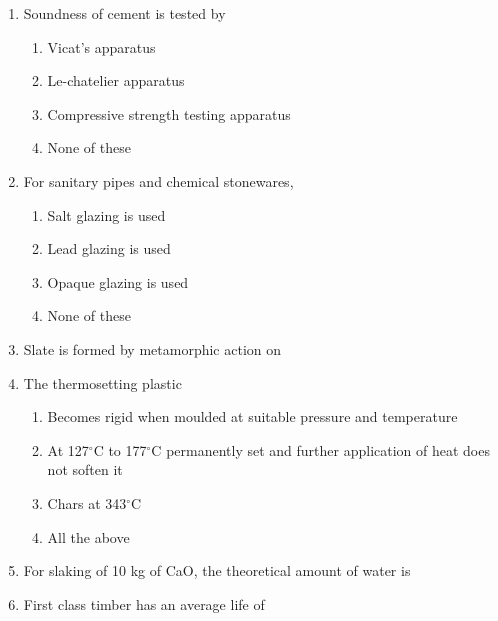 \documentclass[11pt,a4paper]{article}
\begin{document}
\begin{enumerate}
\item{Soundness of cement is tested by}
\begin{enumerate}[label=\Alph*.]
\item{Vicat's apparatus}
\item{Le-chatelier apparatus}
\item{Compressive strength testing apparatus}
\item{None of these}
\end{enumerate}
\item{For sanitary pipes and chemical stonewares,}
\begin{enumerate}[label=\Alph*.]
\item{Salt glazing is used}
\item{Lead glazing is used}
\item{Opaque glazing is used}
\item{None of these}
\end{enumerate}
\item{Slate is formed by metamorphic action on}
\\
\item{The thermosetting plastic}
\begin{enumerate}[label=\Alph*.]
\item{Becomes rigid when moulded at suitable pressure and temperature}
\item{At 127$^\circ$C to 177$^\circ$C permanently set and further application of heat does not soften it}
\item{Chars at 343$^\circ$C}
\item{All the above}
\end{enumerate}
\item{For slaking of 10 kg of CaO, the theoretical amount of water is}
\\
\item{First class timber has an average life of}

\end{enumerate}
\end{document}
